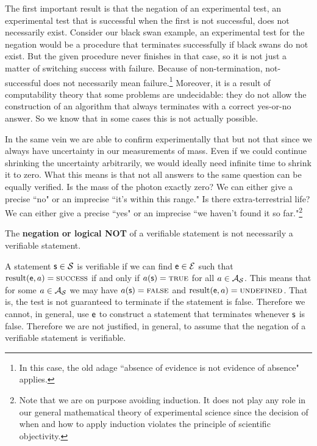 \documentclass[11pt,letterpaper,fleqn]{memoir} %
\begin{document}
The first important result is that the negation of an experimental test, an experimental test that is successful when the first is not successful, does not necessarily exist. Consider our black swan example, an experimental test for the negation would be a procedure that terminates successfully if black swans do not exist. But the given procedure never finishes in that case, so it is not just a matter of switching success with failure. Because of non-termination, not-successful does not necessarily mean failure.\footnote{In this case, the old adage ``absence of evidence is not evidence of absence" applies.} Moreover, it is a result of computability theory that some problems are undecidable: they do not allow the construction of an algorithm that always terminates with a correct yes-or-no answer. So we know that in some cases this is not actually possible.

In the same vein we are able to confirm experimentally that  but not that  since we always have uncertainty in our measurements of mass. Even if we could continue shrinking the uncertainty arbitrarily, we would ideally need infinite time to shrink it to zero. What this means is that not all answers to the same question can be equally verified. Is the mass of the photon exactly zero? We can either give a precise ``no" or an imprecise ``it's within this range." Is there extra-terrestrial life? We can either give a precise ``yes" or an imprecise ``we haven't found it so far."\footnote{Note that we are on purpose avoiding induction. It does not play any role in our general mathematical theory of experimental science since the decision of when and how to apply induction violates the principle of scientific objectivity.}

\begin{mathSection}
	\begin{remark}
	The \textbf{negation or logical NOT} of a verifiable statement is not necessarily a verifiable statement.
	\end{remark}

	\begin{justification}
		A statement $\mathsf{s} \in \mathcal{S}$ is verifiable if we can find $\mathsf{e} \in \mathcal{E}$ such that $\operatorname{result}(\mathsf{e}, a) = \textsc{success}$ if and only if $a(\mathsf{s}) = \textsc{true}$ for all $a \in \mathcal{A}_{\mathcal{S}}$. This means that for some $a \in \mathcal{A}_{\mathcal{S}}$ we may have $a(\mathsf{s}) = \textsc{false}$ and $\operatorname{result}(\mathsf{e}, a) = \textsc{undefined}$. That is, the test is not guaranteed to terminate if the statement is false. Therefore we cannot, in general, use $\mathsf{e}$ to construct a statement that terminates whenever $\mathsf{s}$ is false. Therefore we are not justified, in general, to assume that the negation of a verifiable statement is verifiable.
	\end{justification}
\end{mathSection}
\end{document}
